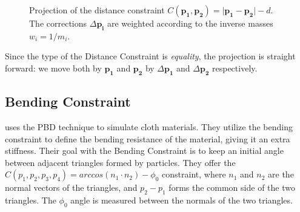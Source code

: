 \documentclass[sigplan,screen,nonacm]{acmart}
\renewcommand{\b}{\boldsymbol}
\begin{document}
\begin{figure}
    \caption{Projection of the distance constraint $C(\b{p_1}, \b{p_2}) = \lvert \b{p_1}
    - \b{p_2} \rvert - d$. The corrections $\Delta \b{p_i}$ are weighted according
    to the inverse masses $w_i = 1/m_i$.}
\end{figure}

Since the type of the Distance Constraint is \emph{equality}, the projection is
straight forward: we move both by $\b{p_1}$ and $\b{p_2}$ by $\Delta \b{p_1}$ and
$\Delta \b{p_2}$ respectively.

\subsection{Bending Constraint} \label{section:bendingConstraint}
\citet{UmenhofferSimulation} uses the PBD technique to simulate cloth materials.
They utilize the bending constraint to define the bending resistance of the
material, giving it an extra stiffness. Their goal with the Bending Constraint
is to keep an initial angle between adjacent triangles formed by particles. They
offer the $C(p_1,p_2,p_3,p_4) = arccos(n_1 \cdot n_2) - \phi _0$ constraint,
where $n_1$ and $n_2$ are the normal vectors of the triangles, and $p_2 - p_1$
forms the common side of the two triangles. The $\phi _0$ angle is measured
between the normals of the two triangles.
\end{document}
